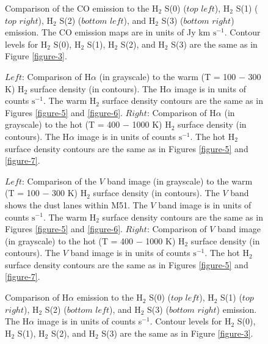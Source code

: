 \documentclass[12pt,preprint]{aastex}
\begin{document}
\begin{figure}
\caption{Comparison of the CO emission to the H$_2$ S(0) ($top$ $left$), 
 H$_2$ S(1) ($top$ $right$),  H$_2$ S(2) ($bottom$ $left$),  and 
 H$_2$ S(3) ($bottom$ $right$) emission.  The CO emission maps are in 
 units of Jy km $\mathrm{s^{-1}}$.  Contour levels for H$_2$ S(0), 
 H$_2$ S(1), H$_2$ S(2), and H$_2$ S(3) are the 
 same as in Figure \ref{figure-3}.}
\label{figure-10}
\end{figure}

\clearpage

\begin{figure}
\caption{$Left$: Comparison of  H$\alpha$ (in grayscale) to the warm (T = 100 $-$ 300 K) 
H$_2$ surface density (in contours).  The H$\alpha$ image is in units of counts 
$\mathrm{s^{-1}}$. The warm H$_2$ surface density contours are the same as in 
Figures \ref{figure-5} and \ref{figure-6}.  $Right$: Comparison of H$\alpha$ (in grayscale) 
to the hot (T = 400 $-$ 1000 K) H$_2$ surface density (in contours).  The H$\alpha$ 
image is in units of counts $\mathrm{s^{-1}}$. The hot H$_2$ surface density 
contours are the same as in Figures \ref{figure-5} and \ref{figure-7}.}
\label{figure-11}
\end{figure}

\clearpage

\begin{figure}
\caption{$Left$: Comparison of  the $V$ band image (in grayscale) to the warm (T = 100 $-$ 300 K) 
H$_2$ surface density (in contours).  The $V$ band shows the dust lanes within M51.
The $V$ band image is in units of counts $\mathrm{s^{-1}}$. 
The warm H$_2$ surface density contours are the same as in 
Figures \ref{figure-5} and \ref{figure-6}.  $Right$: Comparison of $V$ band image (in grayscale) 
to the hot (T = 400 $-$ 1000 K) H$_2$ surface density (in contours).  The $V$ band 
image is in units of counts $\mathrm{s^{-1}}$. The hot H$_2$ surface density 
contours are the same as in Figures \ref{figure-5} and \ref{figure-7}.}
\label{figure-12}
\end{figure}

\clearpage

\begin{figure}
\caption{Comparison of H$\alpha$ emission to the H$_2$ S(0) ($top$ $left$),  
H$_2$ S(1) ($top$ $right$),  H$_2$ S(2) ($bottom$ $left$),  and 
H$_2$ S(3) ($bottom$ $right$) emission.  The H$\alpha$ image is in units 
of counts s$^{-1}$.  Contour levels for H$_2$ S(0), H$_2$ S(1), 
H$_2$ S(2), and H$_2$ S(3) are the same as in Figure \ref{figure-3}.}
\label{figure-13}
\end{figure}
\end{document}
